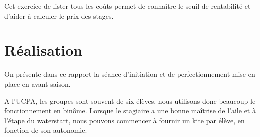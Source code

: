 \documentclass[11pt,a4paper]{report}
\begin{document}

Cet exercice de lister tous les co\^uts permet de connaître le seuil 
de rentabilité et d'aider à calculer le prix des stages.
\FloatBarrier
\section{Réalisation}
On présente dans ce rapport la séance d'initiation et de perfectionnement
mise en place en avant saison.

A l'UCPA, les groupes sont souvent de six élèves, nous
utilisons donc beaucoup le fonctionnement en bin\^ome. 
Lorsque le stagiaire a une bonne maîtrise de l'aile et
à l'étape du waterstart, nous pouvons commencer à fournir
un kite par élève, en fonction de son autonomie.
\end{document}
